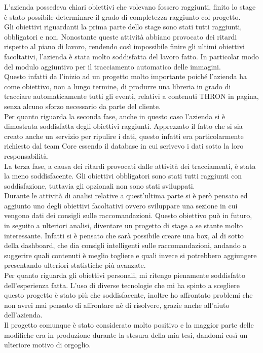 \documentclass[a4paper, 12pt, twoside, openright]{book}
\begin{document}
L'azienda possedeva chiari obiettivi che volevano fossero raggiunti, finito lo stage è stato possibile determinare il grado di completezza raggiunto col progetto.\\
Gli obiettivi riguardanti la prima parte dello stage sono stati tutti raggiunti, obbligatori e non. Nonostante queste attività abbiano provocato dei ritardi rispetto al piano di lavoro, rendendo così impossibile finire gli ultimi obiettivi facoltativi, l'azienda è stata molto soddisfatta del lavoro fatto. In particolar modo del modulo aggiuntivo per il tracciamento automatico delle immagini.\\
Questo infatti da l'inizio ad un progetto molto importante poiché l'azienda ha come obiettivo, non a lungo termine, di produrre una libreria in grado di tracciare automaticamente tutti gli eventi, relativi a contenuti THRON in pagina, senza alcuno sforzo necessario da parte del cliente.\\
Per quanto riguarda la seconda fase, anche in questo caso l'azienda si è dimostrata soddisfatta degli obiettivi raggiunti. Apprezzato il fatto che si sia creato anche un servizio per ripulire i dati, questo infatti era particolarmente richiesto dal team Core essendo il database in cui scrivevo i dati sotto la loro responsabilità.\\
La terza fase, a causa dei ritardi provocati dalle attività dei tracciamenti, è stata la meno soddisfacente. Gli obiettivi obbligatori sono stati tutti raggiunti con soddisfazione, tuttavia gli opzionali non sono stati sviluppati.\\
Durante le attività di analisi relative a quest'ultima parte si è però pensato ed aggiunto uno degli obiettivi facoltativi ovvero sviluppare una sezione in cui vengono dati dei consigli sulle raccomandazioni. Questo obiettivo può in futuro, in seguito a ulteriori analisi, diventare un progetto di stage a se stante molto interessante. Infatti si è pensato che sarà possibile creare una box, al di sotto della dashboard, che dia consigli intelligenti sulle raccomandazioni, andando a suggerire quali contenuti è meglio togliere e quali invece si potrebbero aggiungere presentando ulteriori statistiche più avanzate.\\
Per quanto riguarda gli obiettivi personali, mi ritengo pienamente soddisfatto dell'esperienza fatta. L'uso di diverse tecnologie che mi ha spinto a scegliere questo progetto è stato più che soddisfacente, inoltre ho affrontato problemi che non avrei mai pensato di affrontare nè di risolvere, grazie anche all'aiuto dell'azienda.\\
Il progetto comunque è stato considerato molto positivo e la maggior parte delle modifiche era in produzione durante la stesura della mia tesi, dandomi così un ulteriore motivo di orgoglio.\\
\end{document}
